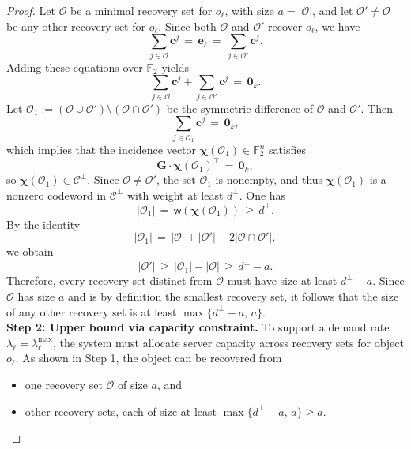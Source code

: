 \documentclass[10pt,a4paper]{amsart}
\begin{document}
\begin{proof}
Let \( \mathcal{O} \) be a minimal recovery set for \( o_\ell \), with size \( a = |\mathcal{O}| \), and let \( \mathcal{O}' \ne \mathcal{O} \) be any other recovery set for \( o_\ell \). Since both \( \mathcal{O} \) and \( \mathcal{O}' \) recover \( o_{\ell} \), we have
\[
\sum_{j \in \mathcal{O}} \boldsymbol{c}^j \,=\, \boldsymbol{e}_{\ell} \,=\, \sum_{j \in \mathcal{O}'} \boldsymbol{c}^j.
\]
Adding these equations over \( \mathbb{F}_2 \) yields
\[
\sum_{j \in \mathcal{O}} \boldsymbol{c}^j + \sum_{j \in \mathcal{O}'} \boldsymbol{c}^j \,=\, \boldsymbol{0}_k.
\]
Let \( \mathcal{O}_1 := (\mathcal{O} \cup \mathcal{O}') \setminus (\mathcal{O} \cap \mathcal{O}') \) be the symmetric difference of \( \mathcal{O} \) and \( \mathcal{O}' \). Then
\[
\sum_{j \in \mathcal{O}_1} \boldsymbol{c}^j \,=\, \boldsymbol{0}_k,
\]
which implies that the incidence vector \( \boldsymbol{\chi}(\mathcal{O}_1) \in \mathbb{F}_2^n \) satisfies
\[
\boldsymbol{G} \cdot \boldsymbol{\chi}(\mathcal{O}_1)^\top \,=\, \boldsymbol{0}_k,
\]
so \( \boldsymbol{\chi}(\mathcal{O}_1) \in \mathcal{C}^\perp \). Since \( \mathcal{O} \ne \mathcal{O}' \), the set \( \mathcal{O}_1 \) is nonempty, and thus \( \boldsymbol{\chi}(\mathcal{O}_1) \) is a nonzero codeword in \( \mathcal{C}^\perp \) with weight at least \( d^\perp \). One has
\[
|\mathcal{O}_1| \,=\, \textsf{w}(\boldsymbol{\chi}(\mathcal{O}_1)) \,\ge\, d^\perp.
\]
By the identity
\[
|\mathcal{O}_1| \,=\, |\mathcal{O}| + |\mathcal{O}'| - 2|\mathcal{O} \cap \mathcal{O}'|,
\]
we obtain
\[
|\mathcal{O}'| \,\ge\, |\mathcal{O}_1| - |\mathcal{O}| \,\ge\, d^\perp - a.
\]
Therefore, every recovery set distinct from \( \mathcal{O} \) must have size at least \( d^\perp - a \). Since \( \mathcal{O} \) has size \( a \) and is by definition the smallest recovery set, it follows that the size of any other recovery set is at least \( \max\{d^\perp - a,\, a\} \).
\\[2ex]
\textbf{Step 2: Upper bound via capacity constraint.}
To support a demand rate \( \lambda_{\ell} = \lambda_{\ell}^{\max} \), the system must allocate server capacity across recovery sets for object \( o_{\ell} \). As shown in Step 1, the object can be recovered from
\begin{itemize}
    \item one recovery set \( \mathcal{O} \) of size \( a \), and
    \item other recovery sets, each of size at least \( \max\{d^{\perp} - a,\, a\} \ge a \).
\end{itemize}


\end{proof}
\end{document}
